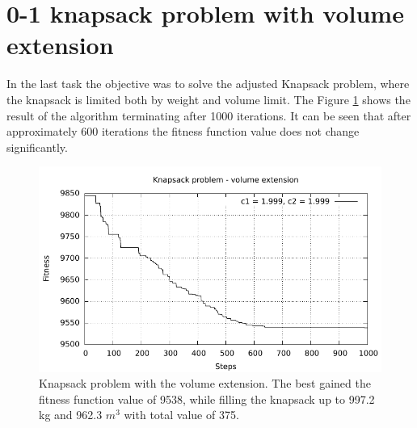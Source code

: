 \section{0-1 knapsack problem with volume extension}
In the last task the objective was to solve the adjusted Knapsack problem, where the knapsack is limited both by weight and volume limit. The Figure \ref{fig:knaspack_volume} shows the result of the algorithm terminating after 1000 iterations. It can be seen that after approximately 600 iterations the fitness function value does not change significantly.

\begin{figure}[!h]
	\centering
		\includegraphics[width=15cm]{img/4a.pdf}
	\caption{Knapsack problem with the volume extension. The best gained the fitness function value of 9538, while filling the knapsack up to 997.2 kg and 962.3 $m^{3}$ with total value of 375.}
	\label{fig:knaspack_volume}
\end{figure}